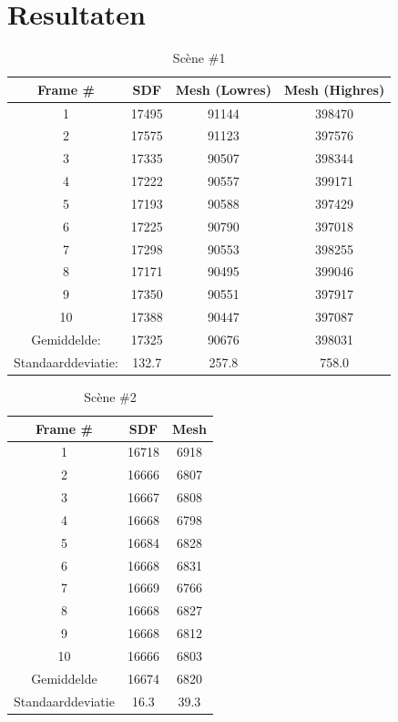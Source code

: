 \documentclass[12pt, a4paper]{article}
\begin{document}
\section{Resultaten}
\begin{table}[H]
	\centering
	\begin{tabular}{| c | c c c |}
		\hline
		Frame \# & SDF & Mesh (Lowres) & Mesh (Highres) \\
		\hline
		1&17495&91144&398470 \\
		2&17575&91123&397576 \\
		3&17335&90507&398344 \\
		4&17222&90557&399171 \\
		5&17193&90588&397429 \\
		6&17225&90790&397018 \\
		7&17298&90553&398255 \\
		8&17171&90495&399046 \\
		9&17350&90551&397917 \\
		10&17388&90447&397087 \\
		\hline
		Gemiddelde:&17325&90676&398031 \\
		Standaarddeviatie:&132.7&257.8&758.0 \\
		\hline
	\end{tabular}
	\caption{Scène \#1}
\end{table}
\begin{table}[H]
\centering
\begin{tabular}{| c | c c |}
	\hline
	Frame \# & SDF & Mesh \\
	\hline
	1 &16718 &6918 \\
	2 &16666 &6807 \\
	3 &16667 &6808 \\
	4 &16668 &6798 \\
	5 &16684 &6828 \\
	6 &16668 &6831 \\
	7 &16669 &6766 \\
	8 &16668 &6827 \\
	9 &16668 &6812 \\
	10 &16666 &6803 \\
	\hline
	Gemiddelde &16674 &6820 \\
	Standaarddeviatie &16.3 &39.3 \\
	\hline
\end{tabular}
\caption{Scène \#2}
\end{table}
\end{document}
